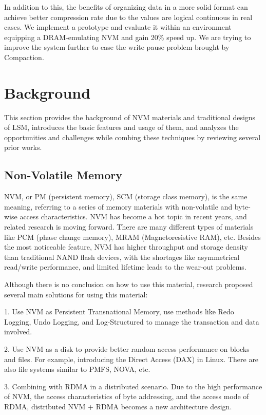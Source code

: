 In addition to this, the benefits of organizing data in a more solid format can achieve better compression rate due to the values are logical continuous in real cases. We implement a prototype and evaluate it within an environment equipping a DRAM-emulating NVM and gain 20\% speed up. We are trying to improve the system further to ease the write pause problem brought by Compaction.


\section{Background}
This section provides the background of NVM materials and traditional designs of LSM, introduces the basic features and usage of them, and analyzes the opportunities and challenges while combing these techniques by reviewing several prior works.

\subsection{Non-Volatile Memory}
NVM, or PM (persistent memory), SCM (storage class memory), is the same meaning, referring to a series of memory materials with non-volatile and byte-wise access characteristics. NVM has become a hot topic in recent years, and related research is moving forward. There are many different types of materials like PCM (phase change memory), MRAM (Magnetoresistive RAM), etc. Besides the most noticeable feature, NVM has higher throughput and storage density than traditional NAND flash devices, with the shortages like asymmetrical read/write performance, and limited lifetime leads to the wear-out problems.


Although there is no conclusion on how to use this material, research proposed several main solutions for using this material: 

1. Use NVM as Persistent Transnational Memory, use methods like Redo Logging, Undo Logging, and Log-Structured to manage the transaction and data involved. 

2. Use NVM as a disk to provide better random access performance on blocks and files. For example, introducing the Direct Access (DAX) in Linux. There are also file systems\cite{dulloor2014system} similar to PMFS, NOVA\cite{xu2016nova}, etc.

3. Combining with RDMA in a distributed scenario. Due to the high performance of NVM, the access characteristics of byte addressing, and the access mode of RDMA, distributed NVM + RDMA becomes a new architecture design.


